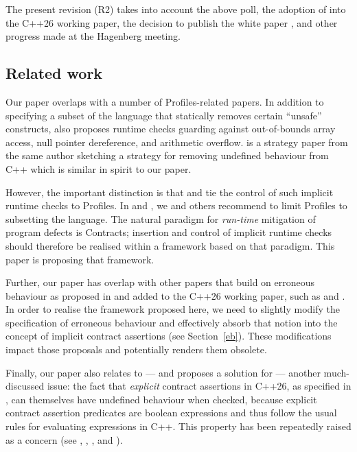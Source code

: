 The present revision (R2) takes into account the above poll, the adoption of \cite{P2900R14} into the C++26 working paper, the decision to publish the white paper \cite{P3656R0}, and other progress made at the Hagenberg meeting.

\subsection{Related work}

Our paper overlaps with a number of Profiles-related papers. In addition to specifying a subset of the language that statically removes certain ``unsafe'' constructs, \cite{P3081R2} also proposes runtime checks guarding against out-of-bounds array access, null pointer dereference, and arithmetic overflow. \cite{P3436R1} is a strategy paper from the same author sketching a strategy for removing undefined behaviour from C++ which is similar in spirit to our paper.

However, the important distinction is that  \cite{P3081R2} and \cite{P3436R1} tie the control of such implicit runtime checks to Profiles. In \cite{P3543R0} and \cite{P3558R1}, we and others recommend to limit Profiles to  subsetting the language. The natural paradigm for \emph{run-time} mitigation of program defects is Contracts; insertion and control of implicit runtime checks should therefore be realised within a framework based on that paradigm. This paper is proposing that framework.

Further, our paper has overlap with other papers that build on erroneous behaviour as proposed in \cite{P2795R5} and added to the C++26 working paper, such as \cite{P2973R0} and \cite{P3232R1}. In order to realise the framework proposed here, we need to slightly modify the specification of erroneous behaviour and effectively absorb that notion into the concept of implicit contract assertions (see Section~\ref{eb}). These modifications impact those proposals and potentially renders them obsolete.

Finally, our paper also relates to --- and proposes a solution for --- another much-discussed issue: the fact that \emph{explicit} contract assertions in C++26, as specified in \cite{P2900R14}, can themselves have undefined behaviour when checked, because explicit contract assertion predicates are boolean expressions and thus follow the usual rules for evaluating expressions in C++. This property has been repeatedly raised as a concern (see \cite{P2680R1}, \cite{P3173R0}, \cite{P3285R0}, and \cite{P3362R0}).

